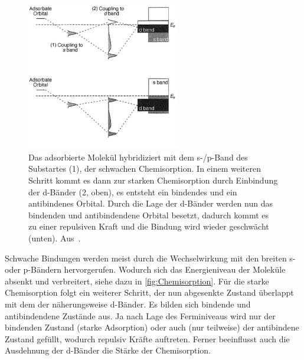            \begin{figure}
                \centering
                \includegraphics[width=0.6\textwidth]{Chemisorption2.PNG}
                \caption{Das adsorbierte Molekül hybridiziert mit dem s-/p-Band des Substartes (1), der schwachen Chemisorption.
                In einem weiteren Schritt kommt es dann zur starken Chemisorption durch Einbindung der d-Bänder (2, oben), es entsteht ein bindendes und ein antibindenes Orbital.
                Durch die Lage der d-Bänder werden nun das bindenden und antibindendene Orbital besetzt, dadurch kommt es zu einer repulsiven Kraft und die Bindung wird wieder geschwächt (unten). Aus~\cite{IF_1}.}
                \label{fig:Chemisorption}
            \end{figure}
            Schwache Bindungen werden meist durch die Wechselwirkung mit den breiten s- oder p-Bändern hervorgerufen.
            Wodurch sich das Energieniveau der Moleküle absenkt und verbreitert, siehe dazu in \autoref{fig:Chemisorption}.
            Für die starke Chemisorption folgt ein weiterer Schritt, der nun abgesenkte Zustand überlappt mit dem der näherungsweise d-Bänder.
            Es bilden sich bindende und antibindendene Zustände aus.
            Ja nach Lage des Ferminiveaus wird nur der bindenden Zustand (starke Adsorption) oder auch (nur teilweise) der antibindene Zustand gefüllt, wodurch repulsiv Kräfte auftreten.
            Ferner beeinflusst auch die Ausdehnung der d-Bänder die Stärke der Chemisorption.
        
